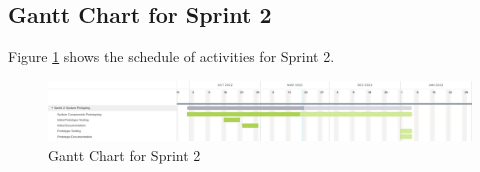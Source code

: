 \subsection{Gantt Chart for Sprint 2}
\label{subsec:gantt_chart_sprint2}
Figure \ref{fig:gantt_chart_sprint2} shows the schedule of activities 
for Sprint 2.
\begin{figure}[ht]
    \centering
    \includegraphics[width=1\textwidth]{./assets/Chapter_3/Gantt/Gantt_Chart_Sprint2.png}
    \caption{Gantt Chart for Sprint 2}
    \label{fig:gantt_chart_sprint2}
\end{figure}
\FloatBarrier
